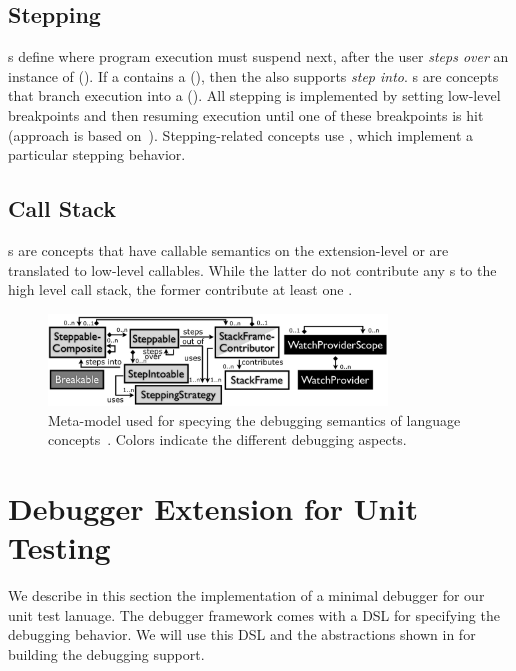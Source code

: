 \subsection{Stepping} 
s define where program execution must suspend
next, after the user \emph{steps over} 
an instance of  (\eg {}). If a
 contains a  (\eg {}), 
then the  also supports \emph{step into}. s are
concepts that branch execution into a  (\eg {}).
All stepping is implemented by setting low-level breakpoints and then resuming
execution until one of these breakpoints is hit (approach is based
on~\cite{Wu06grammar}).
Stepping-related concepts use ,
which implement a particular stepping behavior.

\subsection{Call Stack}
s are
concepts that have callable semantics on the extension-level or are
translated to low-level callables. While the latter do not
contribute any s to the high level call stack, the former
contribute at least one .

\begin{figure}[h]
  \vspace{-2mm}
  \centering
    \includegraphics[width=9cm]{./figures/debugger-concepts.png} 
    \vspace{-2mm}
    \caption{Meta-model used for specying the debugging semantics of language
    concepts~\cite{DBLP:conf/adaEurope/AdaEuropeDeb}. Colors indicate the
    different debugging aspects.} 
  \label{specabs}
  \vspace{-2mm}
\end{figure}

\section{Debugger Extension for Unit Testing}

We describe in this section the implementation of a minimal debugger
for our unit test lanuage. The debugger framework comes with a \ac{DSL}
for specifying the debugging behavior. We will use this \ac{DSL} and the
abstractions shown in  for building the debugging support.

